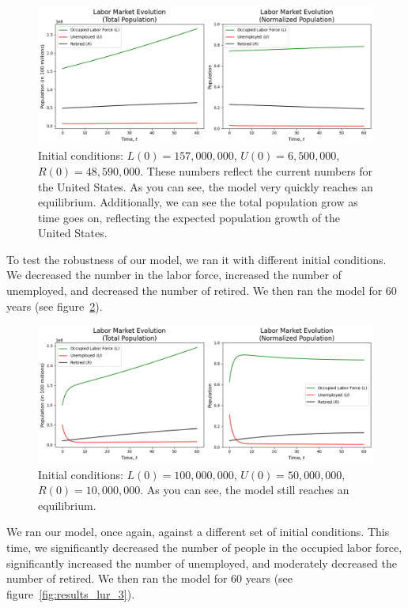 \documentclass[11pt]{amsart}
\begin{document}
\begin{figure}[h]
    \centering
    \includegraphics[width=\textwidth]{figures/results_lur_1.png}
    \caption{Initial conditions: $L(0) = 157,000,000$, $U(0) = 6,500,000$, $R(0) = 48,590,000$. These
             numbers reflect the current numbers for the United States. As you can see, the model very quickly
             reaches an equilibrium. Additionally, we can see the total population grow as time goes on, reflecting
             the expected population growth of the United States.}
    \label{fig:results_lur_1}
\end{figure}

To test the robustness of our model, we ran it with different initial conditions. We decreased the number in the labor force, increased the number of 
unemployed, and decreased the number of retired. We then ran the model for 60 years (see figure~\ref{fig:results_lur_2}).

\begin{figure}[h]
    \centering
    \includegraphics[width=\textwidth]{figures/results_lur_2.png}
    \caption{Initial conditions: $L(0) = 100,000,000$, $U(0) = 50,000,000$, $R(0) = 10,000,000$. As you can see, the model still reaches an equilibrium.}
    \label{fig:results_lur_2}
\end{figure}

\newpage


We ran our model, once again, against a different set of initial conditions. This time, we significantly decreased the number of people in the occupied
labor force, significantly increased the number of unemployed, and moderately decreased the number of retired. We then ran the model for 60 years (see figure~\ref{fig:results_lur_3}).
\end{document}
